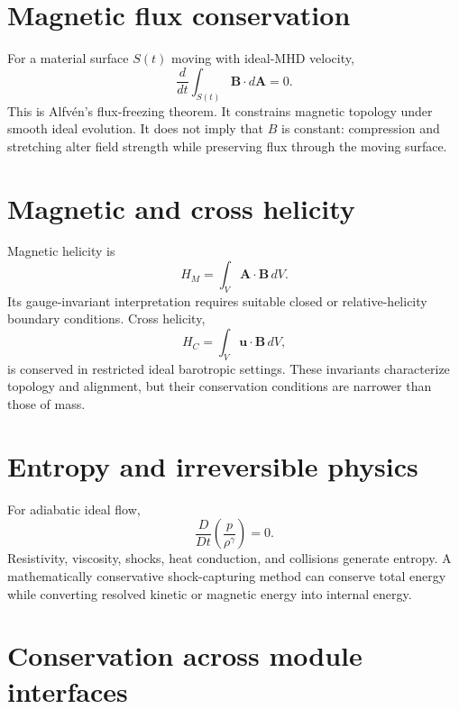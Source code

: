 \documentclass[11pt]{article}
\begin{document}
\section{Magnetic flux conservation}

For a material surface $S(t)$ moving with ideal-MHD velocity,
\begin{equation}
\frac{d}{dt}\int_{S(t)}\mathbf B\cdot d\mathbf A=0.
\end{equation}
This is Alfvén's flux-freezing theorem. It constrains magnetic topology under smooth ideal evolution. It does not imply that $B$ is constant: compression and stretching alter field strength while preserving flux through the moving surface.


\section{Magnetic and cross helicity}

Magnetic helicity is
\begin{equation}
H_M=\int_V\mathbf A\cdot\mathbf B\,dV.
\end{equation}
Its gauge-invariant interpretation requires suitable closed or relative-helicity boundary conditions. Cross helicity,
\begin{equation}
H_C=\int_V\mathbf u\cdot\mathbf B\,dV,
\end{equation}
is conserved in restricted ideal barotropic settings. These invariants characterize topology and alignment, but their conservation conditions are narrower than those of mass.


\section{Entropy and irreversible physics}

For adiabatic ideal flow,
\begin{equation}
\frac{D}{Dt}\left(\frac{p}{\rho^\gamma}\right)=0.
\end{equation}
Resistivity, viscosity, shocks, heat conduction, and collisions generate entropy. A mathematically conservative shock-capturing method can conserve total energy while converting resolved kinetic or magnetic energy into internal energy.


\section{Conservation across module interfaces}
\end{document}
